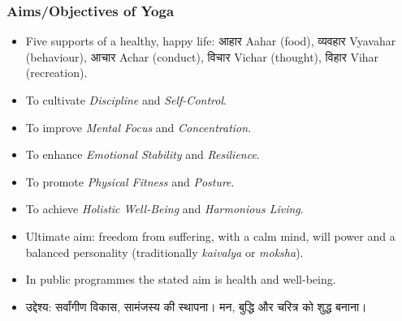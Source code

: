 \begin{frame}[fragile]\frametitle{Aims/Objectives of Yoga}

      \begin{itemize}
		\item Five supports of a healthy, happy life: आहार  Aahar (food), व्यवहार  Vyavahar (behaviour), आचार  Achar (conduct), विचार  Vichar (thought), विहार  Vihar (recreation).
		\item To cultivate \textit{Discipline} and \textit{Self-Control}.
		\item To improve \textit{Mental Focus} and \textit{Concentration}.
		\item To enhance \textit{Emotional Stability} and \textit{Resilience}.
		\item To promote \textit{Physical Fitness} and \textit{Posture}.
		\item To achieve \textit{Holistic Well-Being} and \textit{Harmonious Living}.
		\item Ultimate aim: freedom from suffering, with a calm mind, will power and a balanced personality (traditionally \textit{kaivalya} or \textit{moksha}).
		\item In public programmes the stated aim is health and well-being.
		\item उद्देश्य: सर्वांगीण विकास, सामंजस्य की स्थापना। मन, बुद्धि और चरित्र को शुद्ध बनाना।
	  \end{itemize}

\end{frame}

